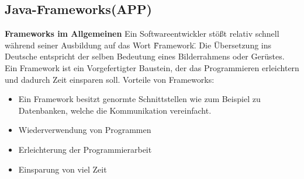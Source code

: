 \clearpage
\subsection{Java-Frameworks(APP)}
\textbf{Frameworks im Allgemeinen\newline}
Ein Softwareentwickler stößt relativ schnell während seiner Ausbildung
auf das Wort \"Framework\". Die Übersetzung ins Deutsche entspricht der selben
Bedeutung eines Bilderrahmens oder Gerüstes.
Ein Framework ist ein Vorgefertigter Baustein, der das Programmieren erleichtern und dadurch
Zeit einsparen soll.
Vorteile von Frameworks:
\begin{itemize}
\item Ein Framework besitzt genormte Schnittstellen wie zum Beispiel zu Datenbanken, welche die Kommunikation vereinfacht. 
\item Wiederverwendung von Programmen 
\item Erleichterung der Programmierarbeit
\item Einsparung von viel Zeit
\end{itemize}

